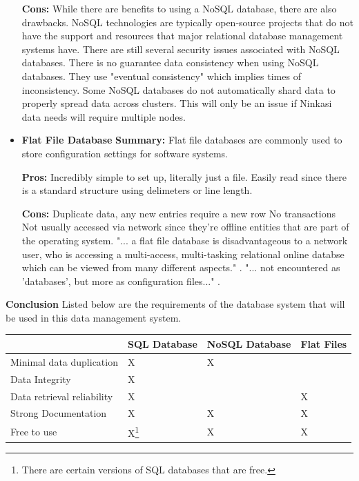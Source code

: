 \documentclass[draftclsnofoot,onecolumn,letterpaper,10pt]{IEEEtran}
\begin{document}
\begin{itemize}
					\textbf{Cons:}
						While there are benefits to using a NoSQL database, there are also drawbacks.
						NoSQL technologies are typically open-source projects that do not have the support and resources that major relational database management systems have\cite{NoSQLProsCons}.
						There are still several security issues associated with NoSQL databases\cite{NoSQLSecurityIssues}.
						There is no guarantee data consistency when using NoSQL databases\cite{ChannelFutures}.
						They use "eventual consistency" which implies times of inconsistency.
						Some NoSQL databases do not automatically shard data to properly spread data across clusters\cite{ChannelFutures}.
						This will only be an issue if Ninkasi data needs will require multiple nodes.


				\item{\textbf{Flat File Database}}
					\textbf{Summary:}
						Flat file databases are commonly used to store configuration settings for software systems.

					\textbf{Pros:}
						Incredibly simple to set up, literally just a file.
						Easily read since there is a standard structure using delimeters or line length.

					\textbf{Cons:}
						Duplicate data, any new entries require a new row
						No transactions
						Not usually accessed via network since they're offline entities that are part of the operating system\cite{Techwalla}.
						"... a flat file database is disadvantageous to a network user, who is accessing a multi-access, multi-tasking relational online databse which can be viewed from many different aspects." \cite{Techwalla}.
						"... not encountered as 'databases', but more as configuration files..." \cite{Techwalla}.

			\end{itemize}


			\textbf{Conclusion}
					Listed below are the requirements of the database system that will be used in this data management system.

					\begin{center}
							\begin{tabular}{| m{15em} | m{10em} | m{10em} | m{10em} |}
									\hline
											& SQL Database & NoSQL Database & Flat Files \\

									\hline
											Minimal data duplication & X & X & \\

									\hline
											Data Integrity & X &  &  \\

									\hline
											Data retrieval reliability & X &  & X \\

									\hline
											Strong Documentation & X & X & X \\

									\hline
											Free to use & X\footnote{There are certain versions of SQL databases that are free.} & X & X \\

									\hline
							\end{tabular}
					\end{center}
\end{document}
